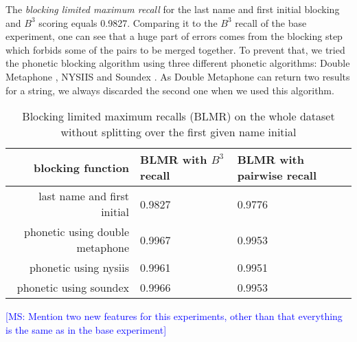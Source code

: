 \documentclass{article}
\newcommand{\msnote}[1]{\textcolor{blue}{[MS: #1]}}
\begin{document}
The \textit{blocking limited maximum recall} for the last name and first initial blocking
and $B^3$ scoring equals 0.9827. Comparing it to the $B^3$ recall of the base experiment,
one can see that a huge part of errors comes from the blocking step which forbids some of
the pairs to be merged together. To prevent that, we tried the phonetic blocking algorithm
using three different phonetic algorithms: Double Metaphone \citep{doublemetaphone}, NYSIIS
\citep{nysiis} and Soundex \citep{Soundex}. As Double Metaphone can return two results for a
string, we always discarded the second one when we used this algorithm.

\FloatBarrier
\begin{table}[H]
\caption{Blocking limited maximum recalls (BLMR) on the whole dataset without splitting over
the first given name initial}
\centering
\begin{tabular}{|r|l|l|}
  \hline
  blocking function & BLMR with $B^{3}$ recall & BLMR with pairwise recall \\
  \hline
  last name and first initial & 0.9827 & 0.9776 \\
  \hline
  phonetic using double metaphone & 0.9967 & 0.9953 \\
  \hline
  phonetic using nysiis & 0.9961 & 0.9951 \\
  \hline
  phonetic using soundex & 0.9966 & 0.9953 \\
  \hline
\end{tabular}
\end{table}

\msnote{Mention two new features for this experiments, other than that everything is the
same as in the base experiment}
\end{document}
